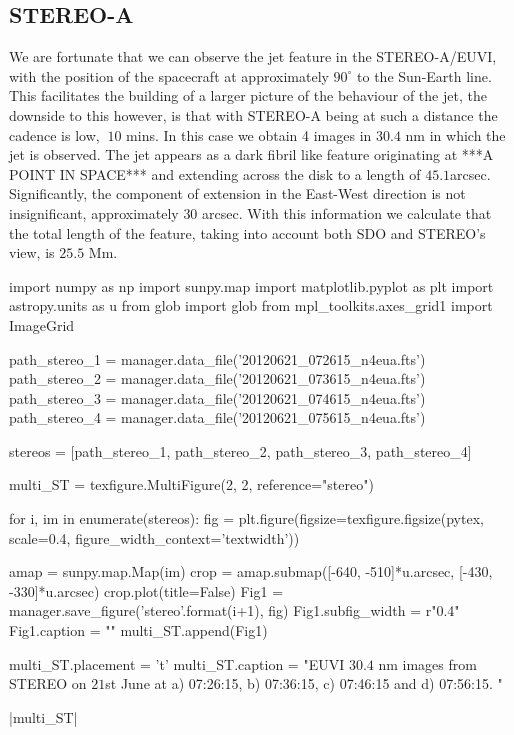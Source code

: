 \documentclass{emulateapj}
\begin{document}
\subsection{STEREO-A}
We are fortunate that we can observe the jet feature in the STEREO-A/EUVI, with the position of the spacecraft at approximately $90^\circ$ to the Sun-Earth line.
This facilitates the building of a larger picture of the behaviour of the jet, the downside to this however, is that with STEREO-A being at such a distance the cadence is low, $~10$ mins.
In this case we obtain 4 images in $30.4$ nm in which the jet is observed.
The jet appears as a dark fibril like feature originating at ***A POINT IN SPACE*** and extending across the disk to a length of $45.1$arcsec.
Significantly, the component of extension in the East-West direction is not insignificant, approximately $30$ arcsec.
With this information we calculate that the total length of the feature, taking into account both SDO and STEREO's view, is $25.5$ Mm.



\begin{pycode}[STEREO]
import numpy as np
import sunpy.map
import matplotlib.pyplot as plt
import astropy.units as u
from glob import glob
from mpl_toolkits.axes_grid1 import ImageGrid

path_stereo_1 = manager.data_file('20120621_072615_n4eua.fts')
path_stereo_2 = manager.data_file('20120621_073615_n4eua.fts')
path_stereo_3 = manager.data_file('20120621_074615_n4eua.fts')
path_stereo_4 = manager.data_file('20120621_075615_n4eua.fts')

stereos = [path_stereo_1, path_stereo_2, path_stereo_3, path_stereo_4]


multi_ST = texfigure.MultiFigure(2, 2, reference="stereo")


for i, im in enumerate(stereos):
	fig = plt.figure(figsize=texfigure.figsize(pytex, scale=0.4, figure_width_context='textwidth'))
	
	amap = sunpy.map.Map(im)
	crop = amap.submap([-640, -510]*u.arcsec, [-430, -330]*u.arcsec)
	crop.plot(title=False)
	Fig1 = manager.save_figure('stereo{}'.format(i+1), fig)
	Fig1.subfig_width = r"0.4\textwidth"
	Fig1.caption = ""
	multi_ST.append(Fig1)

multi_ST.placement = 't'
multi_ST.caption = "EUVI $30.4$ nm images from STEREO on $21$st June at a) 07:26:15, b) 07:36:15, c) 07:46:15 and d) 07:56:15. "
\end{pycode}

\py[STEREO]|multi_ST|
\end{document}

